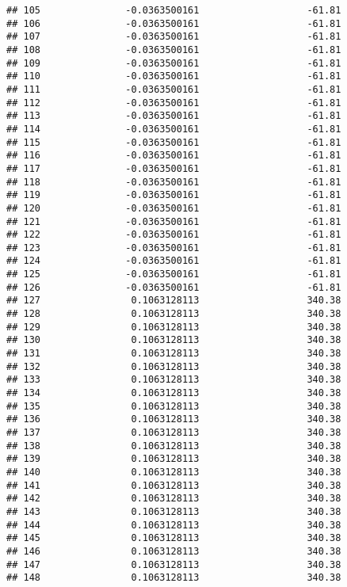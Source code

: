 \documentclass[]{article}
\begin{document}
\begin{verbatim}
## 105               -0.0363500161                   -61.81
## 106               -0.0363500161                   -61.81
## 107               -0.0363500161                   -61.81
## 108               -0.0363500161                   -61.81
## 109               -0.0363500161                   -61.81
## 110               -0.0363500161                   -61.81
## 111               -0.0363500161                   -61.81
## 112               -0.0363500161                   -61.81
## 113               -0.0363500161                   -61.81
## 114               -0.0363500161                   -61.81
## 115               -0.0363500161                   -61.81
## 116               -0.0363500161                   -61.81
## 117               -0.0363500161                   -61.81
## 118               -0.0363500161                   -61.81
## 119               -0.0363500161                   -61.81
## 120               -0.0363500161                   -61.81
## 121               -0.0363500161                   -61.81
## 122               -0.0363500161                   -61.81
## 123               -0.0363500161                   -61.81
## 124               -0.0363500161                   -61.81
## 125               -0.0363500161                   -61.81
## 126               -0.0363500161                   -61.81
## 127                0.1063128113                   340.38
## 128                0.1063128113                   340.38
## 129                0.1063128113                   340.38
## 130                0.1063128113                   340.38
## 131                0.1063128113                   340.38
## 132                0.1063128113                   340.38
## 133                0.1063128113                   340.38
## 134                0.1063128113                   340.38
## 135                0.1063128113                   340.38
## 136                0.1063128113                   340.38
## 137                0.1063128113                   340.38
## 138                0.1063128113                   340.38
## 139                0.1063128113                   340.38
## 140                0.1063128113                   340.38
## 141                0.1063128113                   340.38
## 142                0.1063128113                   340.38
## 143                0.1063128113                   340.38
## 144                0.1063128113                   340.38
## 145                0.1063128113                   340.38
## 146                0.1063128113                   340.38
## 147                0.1063128113                   340.38
## 148                0.1063128113                   340.38

\end{verbatim}
\end{document}
